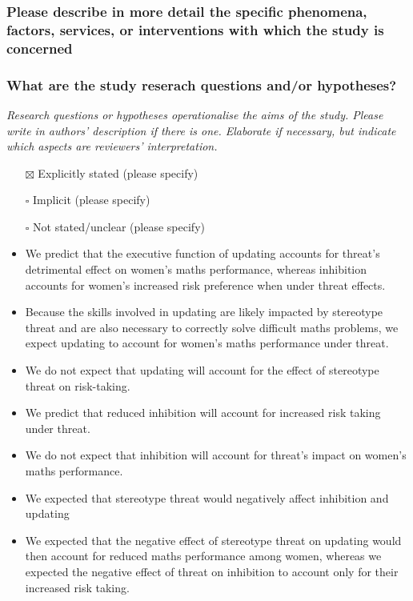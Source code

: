 \documentclass[
  doc, a4paper]{apa7}
\begin{document}
\subsubsection{Please describe in more detail the specific phenomena, factors, services, or interventions with which the study is concerned}\label{please-describe-in-more-detail-the-specific-phenomena-factors-services-or-interventions-with-which-the-study-is-concerned}

\subsubsection{What are the study reserach questions and/or hypotheses?}\label{what-are-the-study-reserach-questions-andor-hypotheses}

\emph{Research questions or hypotheses operationalise the aims of the study. Please write in authors' description if there is one. Elaborate if necessary, but indicate which aspects are reviewers' interpretation.}

\begin{itemize}
\item[$\boxtimes$]
  Explicitly stated (please specify)\\
\item[$\square$]
  Implicit (please specify)\\
\item[$\square$]
  Not stated/unclear (please specify)
\item
  We predict that the executive function of updating accounts for threat's detrimental effect on women's maths performance, whereas inhibition accounts for women's increased risk preference when under threat effects.
\item
  Because the skills involved in updating are likely impacted by stereotype threat and are also necessary to correctly solve difficult maths problems, we expect updating to account for women's maths performance under threat.
\item
  We do not expect that updating will account for the effect of stereotype threat on risk-taking.\\
\item
  We predict that reduced inhibition will account for increased risk taking under threat.
\item
  We do not expect that inhibition will account for threat's impact on women's maths performance.
\item
  We expected that stereotype threat would negatively affect inhibition and updating
\item
  We expected that the negative effect of stereotype threat on updating would then account for reduced maths performance among women, whereas we expected the negative effect of threat on inhibition to account only for their increased risk taking.
\end{itemize}
\end{document}
